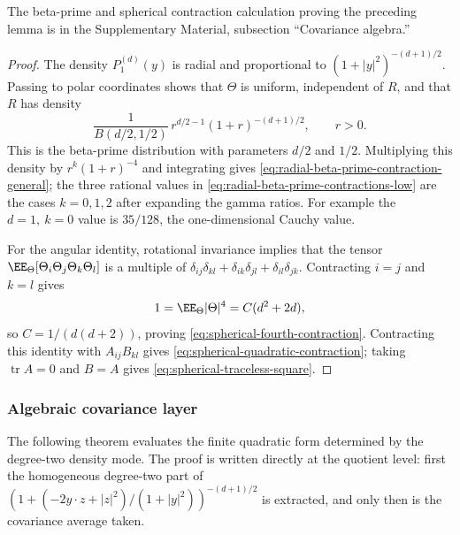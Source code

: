 \ifdefined\JFAArticleMain
The beta-prime and spherical contraction calculation proving the preceding
lemma is in the Supplementary Material, subsection ``Covariance algebra.''
\else
\begin{proof}
The density \(P_1^{(d)}(y)\) is radial and proportional to
\((1+|y|^2)^{-(d+1)/2}\).  Passing to polar coordinates shows that
\(\Theta\) is uniform, independent of \(R\), and that \(R\) has density
\[
\frac{1}{B(d/2,1/2)}\,r^{d/2-1}(1+r)^{-(d+1)/2},
\qquad r>0.
\]
This is the beta-prime distribution with parameters \(d/2\) and \(1/2\).
Multiplying this density by \(r^k(1+r)^{-4}\) and integrating gives
\eqref{eq:radial-beta-prime-contraction-general}; the three rational values
in \eqref{eq:radial-beta-prime-contractions-low} are the cases
\(k=0,1,2\) after expanding the gamma ratios.  For example the
\(d=1,\ k=0\) value is \(35/128\), the one-dimensional Cauchy value.

For the angular identity, rotational invariance implies that the tensor
\(\EE_\Theta[\Theta_i\Theta_j\Theta_k\Theta_l]\) is a multiple of
\(\delta_{ij}\delta_{kl}+\delta_{ik}\delta_{jl}+\delta_{il}\delta_{jk}\).
Contracting \(i=j\) and \(k=l\) gives
\[
1=\EE_\Theta|\Theta|^4=C(d^2+2d),
\]
so \(C=1/(d(d+2))\), proving
\eqref{eq:spherical-fourth-contraction}.  Contracting this identity with
\(A_{ij}B_{kl}\) gives \eqref{eq:spherical-quadratic-contraction}; taking
\(\operatorname{tr}A=0\) and \(B=A\) gives
\eqref{eq:spherical-traceless-square}.
\end{proof}
\fi

\subsubsection*{Algebraic covariance layer}\leavevmode\par\smallskip

The following theorem evaluates the finite quadratic form determined by the
degree-two density mode.  The proof is written directly at the quotient level:
first the homogeneous degree-two part of
\((1+(-2y\cdot z+|z|^2)/(1+|y|^2))^{-(d+1)/2}\) is extracted, and only then
is the covariance average taken.

